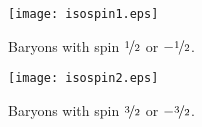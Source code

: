 \begin{figure}\begin{center}
\texttt{[image: isospin1.eps]}
\caption{Baryons with spin $\nicefrac{1}{2}$ or $-\nicefrac{1}{2}$.}\label{fig:isospin1}
\end{center}\end{figure}

\begin{figure}\begin{center}
\texttt{[image: isospin2.eps]}
\caption{Baryons with spin $\nicefrac{3}{2}$ or $-\nicefrac{3}{2}$.}\label{fig:isospin2}
\end{center}\end{figure}




